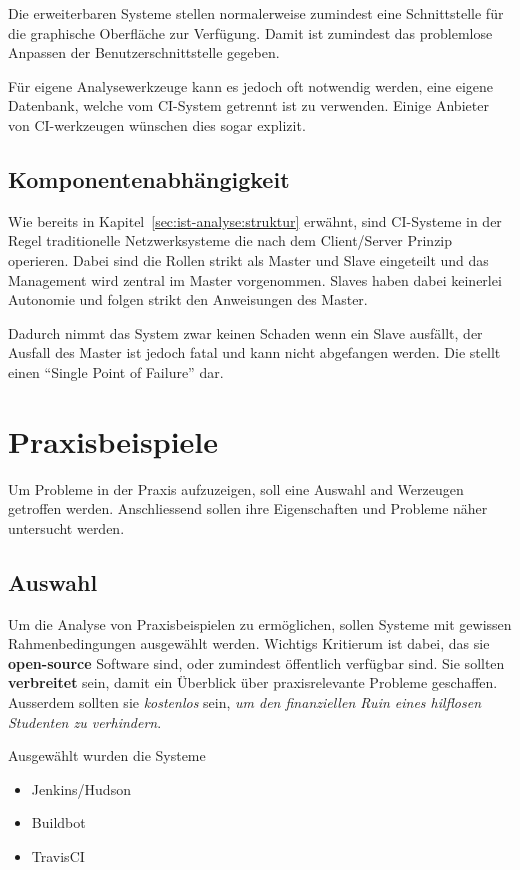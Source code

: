 Die erweiterbaren Systeme stellen normalerweise zumindest eine Schnittstelle
f\"ur die graphische Oberfl\"ache zur Verf\"ugung.
Damit ist zumindest das problemlose Anpassen der Benutzerschnittstelle gegeben.


F\"ur eigene Analysewerkzeuge kann es jedoch oft notwendig werden,
eine eigene Datenbank, welche vom CI-System getrennt ist zu verwenden.
Einige Anbieter von CI-werkzeugen w\"unschen dies sogar explizit.


\subsection{Komponentenabh\"angigkeit}

Wie bereits in Kapitel~\ref{sec:ist-analyse:struktur} erw\"ahnt,
sind CI-Systeme in der Regel traditionelle Netzwerksysteme die nach dem Client/Server Prinzip operieren.
Dabei sind die Rollen strikt als Master und Slave eingeteilt und das Management wird zentral im Master vorgenommen.
Slaves haben dabei keinerlei Autonomie und folgen strikt den Anweisungen des Master.

Dadurch nimmt das System zwar keinen Schaden wenn ein Slave ausf\"allt,
der Ausfall des Master ist jedoch fatal und kann nicht abgefangen werden.
Die stellt einen ``Single Point of Failure'' dar.


\section{Praxisbeispiele}

Um Probleme in der Praxis aufzuzeigen,
soll eine Auswahl and Werzeugen getroffen werden.
Anschliessend sollen ihre Eigenschaften und Probleme
n\"aher untersucht werden.


\subsection{Auswahl}

Um die Analyse von Praxisbeispielen zu erm\"oglichen,
sollen Systeme mit gewissen Rahmenbedingungen ausgew\"ahlt werden.
Wichtigs Kritierum ist dabei, das sie \textbf{open-source} Software sind,
oder zumindest \"offentlich verf\"ugbar sind.
Sie sollten \textbf{verbreitet} sein, damit ein \"Uberblick
\"uber praxisrelevante Probleme geschaffen.
Ausserdem sollten sie \textit{kostenlos} sein,
\textit{um den finanziellen Ruin eines hilflosen Studenten zu verhindern}.

Ausgew\"ahlt wurden die Systeme
\begin{itemize}
  \item Jenkins/Hudson
  \item Buildbot
  \item TravisCI
\end{itemize}


